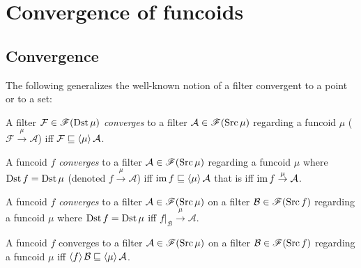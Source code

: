 
\chapter{Convergence of funcoids}


\section{Convergence}

The following generalizes the well-known notion of a filter convergent
to a point or to a set:
\begin{defn}
A filter $\mathcal{F}\in\mathscr{F}(\operatorname{Dst}\mu)$
\emph{converges} to a filter $\mathcal{A}\in\mathscr{F}(\operatorname{Src}\mu)$
regarding a funcoid $\mu$ ($\mathcal{F}\overset{\mu}{\rightarrow}\mathcal{A}$)
iff $\mathcal{F}\sqsubseteq\left\langle \mu\right\rangle\mathcal{A}$.
\end{defn}

\begin{defn}
A funcoid $f$ \emph{converges}
to a filter $\mathcal{A}\in\mathscr{F}(\operatorname{Src}\mu)$ regarding a funcoid
$\mu$ where $\operatorname{Dst} f=\operatorname{Dst}\mu$ (denoted $f\overset{\mu}{\rightarrow}\mathcal{A}$)
iff $\operatorname{im} f\sqsubseteq\left\langle \mu\right\rangle\mathcal{A}$ that is iff $\operatorname{im} f\overset{\mu}{\rightarrow}\mathcal{A}$.
\end{defn}

\begin{defn}
A funcoid $f$ \emph{converges}
to a filter $\mathcal{A}\in\mathscr{F}(\operatorname{Src}\mu)$ on a filter $\mathcal{B}\in\mathscr{F}(\operatorname{Src} f)$
regarding a funcoid $\mu$ where $\operatorname{Dst} f=\operatorname{Dst}\mu$ iff $f|_{\mathcal{B}}\overset{\mu}{\rightarrow}\mathcal{A}$.\end{defn}
\begin{obvious}
A funcoid $f$ converges to a filter
$\mathcal{A}\in\mathscr{F}(\operatorname{Src}\mu)$ on a filter
$\mathcal{B}\in\mathscr{F}(\operatorname{Src} f)$ regarding a funcoid $\mu$ iff
$\left\langle f\right\rangle\mathcal{B}\sqsubseteq\left\langle \mu\right\rangle\mathcal{A}$.
\end{obvious}

